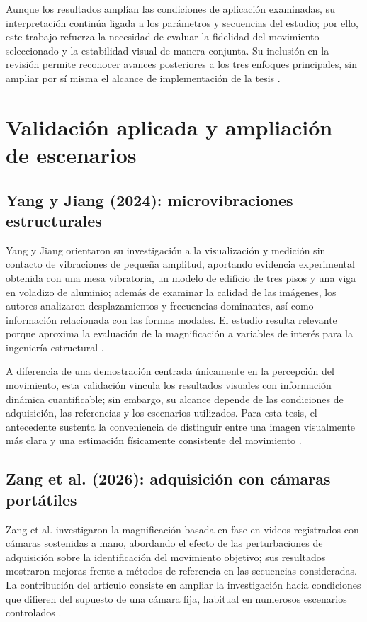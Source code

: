 Aunque los resultados amplían las condiciones de aplicación examinadas, su interpretación continúa ligada a los parámetros y secuencias del estudio; por ello, este trabajo refuerza la necesidad de evaluar la fidelidad del movimiento seleccionado y la estabilidad visual de manera conjunta. Su inclusión en la revisión permite reconocer avances posteriores a los tres enfoques principales, sin ampliar por sí misma el alcance de implementación de la tesis \cite{takeda2022bilateral}.

\section{Validación aplicada y ampliación de escenarios}

\subsection{Yang y Jiang (2024): microvibraciones estructurales}

Yang y Jiang orientaron su investigación a la visualización y medición sin contacto de vibraciones de pequeña amplitud, aportando evidencia experimental obtenida con una mesa vibratoria, un modelo de edificio de tres pisos y una viga en voladizo de aluminio; además de examinar la calidad de las imágenes, los autores analizaron desplazamientos y frecuencias dominantes, así como información relacionada con las formas modales. El estudio resulta relevante porque aproxima la evaluación de la magnificación a variables de interés para la ingeniería estructural \cite{yang2024phase}.

A diferencia de una demostración centrada únicamente en la percepción del movimiento, esta validación vincula los resultados visuales con información dinámica cuantificable; sin embargo, su alcance depende de las condiciones de adquisición, las referencias y los escenarios utilizados. Para esta tesis, el antecedente sustenta la conveniencia de distinguir entre una imagen visualmente más clara y una estimación físicamente consistente del movimiento \cite{yang2024phase}.

\subsection{Zang et al. (2026): adquisición con cámaras portátiles}

Zang et al. investigaron la magnificación basada en fase en videos registrados con cámaras sostenidas a mano, abordando el efecto de las perturbaciones de adquisición sobre la identificación del movimiento objetivo; sus resultados mostraron mejoras frente a métodos de referencia en las secuencias consideradas. La contribución del artículo consiste en ampliar la investigación hacia condiciones que difieren del supuesto de una cámara fija, habitual en numerosos escenarios controlados \cite{zang2026phase}.

